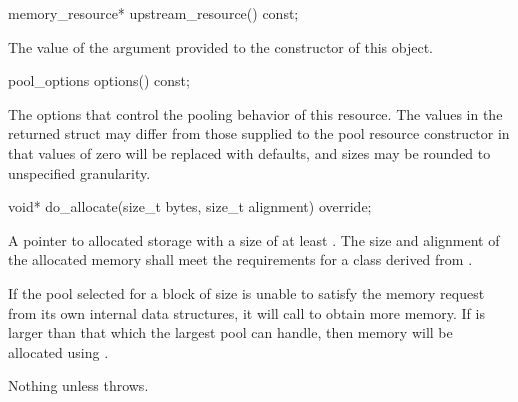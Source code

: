 %
%
\begin{itemdecl}
memory_resource* upstream_resource() const;
\end{itemdecl}

\begin{itemdescr}
\pnum
\returns
The value of the  argument
provided to the constructor of this object.
\end{itemdescr}

%
%
\begin{itemdecl}
pool_options options() const;
\end{itemdecl}

\begin{itemdescr}
\pnum
\returns
The options that control the pooling behavior of this resource.
The values in the returned struct may differ
from those supplied to the pool resource constructor in that
values of zero will be replaced with 
defaults, and sizes may be rounded to unspecified granularity.
\end{itemdescr}

%
%
\begin{itemdecl}
void* do_allocate(size_t bytes, size_t alignment) override;
\end{itemdecl}

\begin{itemdescr}
\pnum
\returns
A pointer to allocated storage
with a size of at least .
The size and alignment of the allocated memory shall meet the requirements
for a class derived from .

\pnum
\effects
If the pool selected for a block of size 
is unable to satisfy the memory request from its own internal data structures,
it will call  to obtain more memory.
If  is larger than that which the largest pool can handle,
then memory will be allocated using .

\pnum
\throws
Nothing unless  throws.
\end{itemdescr}

